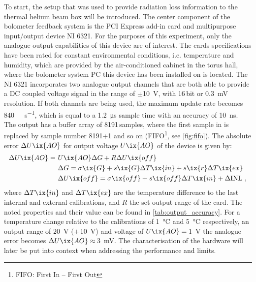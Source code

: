         To start, the setup that was used to provide radiation loss information to the thermal helium beam box will be introduced. The center component of the bolometer feedback system is the PCI Express add-in card and multipurpose input/output device NI\textsuperscript{\textregistered} 6321. For the purposes of this experiment, only the analogue output capabilities of this device are of interest. The cards specifications have been rated for constant environmental conditions, i.e. temperature and humidity, which are provided by the air-conditioned cabinet in the torus hall, where the bolometer system PC this device has been installed on is located. The NI\textsuperscript{\textregistered} 6321 incorporates two analogue output channels that are both able to provide a DC coupled voltage signal in the range of $\pm$\SI{10}{\volt}, with 16$\,$bit or \SI{0.3}{\milli\volt} resolution. If both channels are being used, the maximum update rate becomes \SI{840}{\kilo\sample\per\second}, which is equal to a \SI{1.2}{\micro\second} sample time with an accuracy of \SI{10}{\nano\second}. The output has a buffer array of 8191$\,$samples, where the first sample in is replaced by sample number 8191+1 and so on (FIFO\footnote[1]{FIFO: First In – First Out}, see \cref{fig:fifo}). The absolute error $\Delta U\ix{AO}$ for output voltage $U\ix{AO}$ of the device is given by:%
%
        \begin{align}%
            \begin{split}\label{eq:output_accuracy}%
                \Delta U\ix{AO}=\,\,&U\ix{AO}\Delta G+R\Delta U\ix{off}\\%
                &\Delta G=\sigma\ix{G}+s\ix{G}\Delta T\ix{in}+s\ix{r}\Delta T\ix{ex}\\%
                &\Delta U\ix{off}=\sigma\ix{off}+s\ix{off}\Delta T\ix{in}+\Delta\text{INL}\,\,,\\%
            \end{split}%
        \end{align}%
%
        where $\Delta T\ix{in}$ and $\Delta T\ix{ex}$ are the temperature difference to the last internal and external calibrations, and $R$ the set output range of the card. The noted properties and their value can be found in \cref{tab:output_accuracy}. For a temperature change relative to the calibrations of \SI{1}{\celsius} and \SI{5}{\celsius} respectively, an output range of \SI{20}{\volt} ($\pm\,$\SI{10}{\volt}) and voltage of $U\ix{AO}=\,$\SI{1}{\volt} the analogue error becomes $\Delta U\ix{AO}\approx\,$\SI{3}{\milli\volt}. The characterisation of the hardware will later be put into context when addressing the performance and limits.\\%
